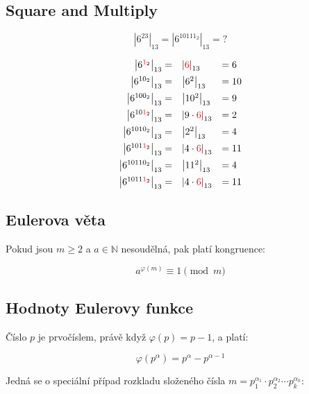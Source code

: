 \documentclass[a4paper]{article}
\newcommand{\N}{\mathbb{N}}
\begin{document}
\subsection{Square and Multiply}

\[
    \left| 6^{23} \right|_{13} = \left| 6^{10111_2} \right|_{13} = \text{?}
\]

\[
    \begin{array}{rll}
        \left| 6^{{\color{red}1}_2} \right|_{13} =     & \left| {\color{red}6} \right|_{13}         & = 6  \\[1.8mm]
        \left| 6^{10_2} \right|_{13} =                 & \left| 6^{2} \right|_{13}                  & = 10 \\[1.8mm]
        \left| 6^{100_2} \right|_{13} =                & \left| 10^2 \right|_{13}                   & = 9  \\[1.8mm]
        \left| 6^{10{\color{red}1}_2} \right|_{13} =   & \left| 9 \cdot {\color{red}6} \right|_{13} & = 2  \\[1.8mm]
        \left| 6^{1010_2} \right|_{13} =               & \left| 2^2 \right|_{13}                    & = 4  \\[1.8mm]
        \left| 6^{101{\color{red}1}_2} \right|_{13} =  & \left| 4 \cdot {\color{red}6} \right|_{13} & = 11 \\[1.8mm]
        \left| 6^{10110_2} \right|_{13} =              & \left| 11^2 \right|_{13}                   & = 4  \\[1.8mm]
        \left| 6^{1011{\color{red}1}_2} \right|_{13} = & \left| 4 \cdot {\color{red}6} \right|_{13} & = 11
    \end{array}
\]

\subsection{Eulerova věta}

Pokud jsou $m \ge 2$ a $a \in \N$ nesoudělná, pak platí kongruence:

\[
    a^{\varphi(m)} \equiv 1 \pmod{m}
\]

\subsection{Hodnoty Eulerovy funkce}

Číslo $p$ je prvočíslem, právě když $\varphi(p) = p - 1$, a platí:

\[
    \varphi(p^\alpha) = p^\alpha - p^{\alpha-1}
\]

Jedná se o speciální případ rozkladu složeného čísla $m = p_1^{\alpha_1} \cdot p_2^{\alpha_2} \cdots p_k^{\alpha_k}$:
\end{document}
